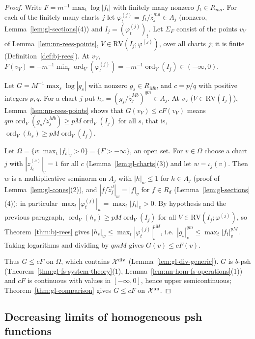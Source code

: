 \begin{proof}
Write $F=m^{-1}\max_t\log|f_t|$ with finitely many nonzero $f_t\in R_{ma}$. For each of the finitely many charts $j$ let
$\varphi_t^{(j)}=f_t/\tilde z_j^{ma}\in A_j$ (nonzero, Lemma~\ref{lem:gl-sections}(4)) and $I_j=(\varphi_t^{(j)})_t$. Let $\Sigma_F$ consist of the points
$v_V$ of Lemma~\ref{lem:nn-rees-points}, $V\in\mathrm{RV}(I_j;\varphi^{(j)})$, over all charts $j$; it is finite (Definition~\ref{def:bj-rees}). At
$v_V$, $F(v_V)=-m^{-1}\min_t\operatorname{ord}_V(\varphi^{(j)}_t)=-m^{-1}\operatorname{ord}_V(I_j)\in(-\infty,0)$.

Let $G=M^{-1}\max_s\log|g_s|$ with nonzero $g_s\in R_{Mb}$, and $c=p/q$ with positive integers $p,q$. For a chart $j$ put
$h_s=(g_s/\tilde z_j^{Mb})^{qm}\in A_j$. At $v_V$ ($V\in\mathrm{RV}(I_j)$), Lemma~\ref{lem:nn-rees-points} shows that $G(v_V)\le cF(v_V)$ means
$qm\operatorname{ord}_V(g_s/\tilde z_j^{Mb})\ge pM\operatorname{ord}_V(I_j)$ for all $s$, that is, $\operatorname{ord}_V(h_s)\ge pM\operatorname{ord}_V(I_j)$.

Let $\Omega=\{v:\max_t|f_t|_v>0\}=\{F>-\infty\}$, an open set. For $v\in\Omega$ choose a chart $j$ with $|z^{(c)}_{j_c}|_v=1$ for all $c$
(Lemma~\ref{lem:gl-charts}(3)) and let $w=\iota_j(v)$. Then $w$ is a multiplicative seminorm on $A_j$ with $|h|_w\le1$ for $h\in A_j$ (proof of
Lemma~\ref{lem:gl-cones}(2)), and $|f/\tilde z_j^d|_w=|f|_v$ for $f\in R_d$ (Lemma~\ref{lem:gl-sections}(4)); in particular
$\max_t|\varphi^{(j)}_t|_w=\max_t|f_t|_v>0$. By hypothesis and the previous paragraph, $\operatorname{ord}_V(h_s)\ge pM\operatorname{ord}_V(I_j)$ for all
$V\in\mathrm{RV}(I_j;\varphi^{(j)})$, so Theorem~\ref{thm:bj-rees} gives $|h_s|_w\le\max_t|\varphi^{(j)}_t|_w^{pM}$, i.e.\
$|g_s|_v^{qm}\le\max_t|f_t|_v^{pM}$. Taking logarithms and dividing by $qmM$ gives $G(v)\le cF(v)$.

Thus $G\le cF$ on $\Omega$, which contains $\mathcal X^{\mathrm{div}}$ (Lemma~\ref{lem:gl-div-generic}). $G$ is $b$-psh (Theorem~\ref{thm:gl-fs-system-theory}(1),
Lemma~\ref{lem:nn-hom-fs-operations}(1)) and $cF$ is continuous with values in $[-\infty,0]$, hence upper semicontinuous; Theorem~\ref{thm:gl-comparison} gives
$G\le cF$ on $\mathcal X^{\mathrm{an}}$.
\end{proof}

\subsection{Decreasing limits of homogeneous psh functions}\label{subsec:nn-psh2-hom}

